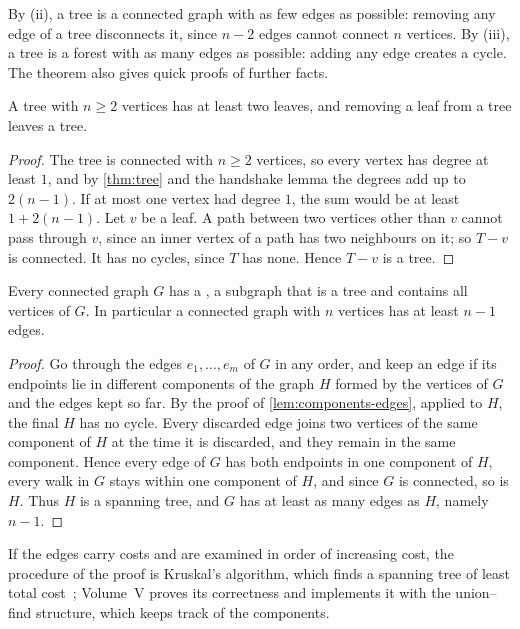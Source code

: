By (ii), a tree is a connected graph with as few edges as possible: removing any edge of a tree disconnects it, since $n-2$ edges cannot connect $n$ vertices. By (iii), a tree is a forest with as many edges as possible: adding any edge creates a cycle. The theorem also gives quick proofs of further facts.

\begin{corollary}
\label{cor:leaves}
A tree with $n\ge2$ vertices has at least two leaves, and removing a leaf from a tree leaves a tree.
\end{corollary}

\begin{proof}
The tree is connected with $n\ge2$ vertices, so every vertex has degree at least $1$, and by \cref{thm:tree} and the handshake lemma the degrees add up to $2(n-1)$. If at most one vertex had degree $1$, the sum would be at least $1+2(n-1)$. Let $v$ be a leaf. A path between two vertices other than $v$ cannot pass through $v$, since an inner vertex of a path has two neighbours on it; so $T-v$ is connected. It has no cycles, since $T$ has none. Hence $T-v$ is a tree.
\end{proof}

\begin{corollary}
\label{cor:spanning-tree}
Every connected graph $G$ has a , a subgraph that is a tree and contains all vertices of $G$. In particular a connected graph with $n$ vertices has at least $n-1$ edges.
\end{corollary}

\begin{proof}
Go through the edges $e_1,\ldots,e_m$ of $G$ in any order, and keep an edge if its endpoints lie in different components of the graph $H$ formed by the vertices of $G$ and the edges kept so far. By the proof of \cref{lem:components-edges}, applied to $H$, the final $H$ has no cycle. Every discarded edge joins two vertices of the same component of $H$ at the time it is discarded, and they remain in the same component. Hence every edge of $G$ has both endpoints in one component of $H$, every walk in $G$ stays within one component of $H$, and since $G$ is connected, so is $H$. Thus $H$ is a spanning tree, and $G$ has at least as many edges as $H$, namely $n-1$.
\end{proof}

If the edges carry costs and are examined in order of increasing cost, the procedure of the proof is Kruskal's algorithm, which finds a spanning tree of least total cost~\cite{kruskal1956}; Volume~V proves its correctness and implements it with the union--find structure, which keeps track of the components.

